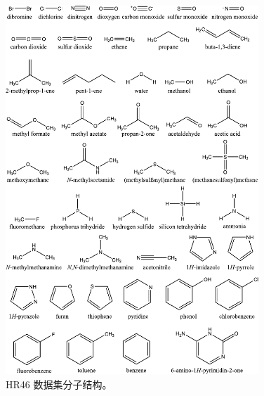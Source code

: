 \begin{figure}[H]
    \centering
    \includegraphics[width=0.85\textwidth]{assets/fig-s1.pdf}
    \caption{HR46 数据集分子结构。}
    \label{fig.fig-s1}
\end{figure}

